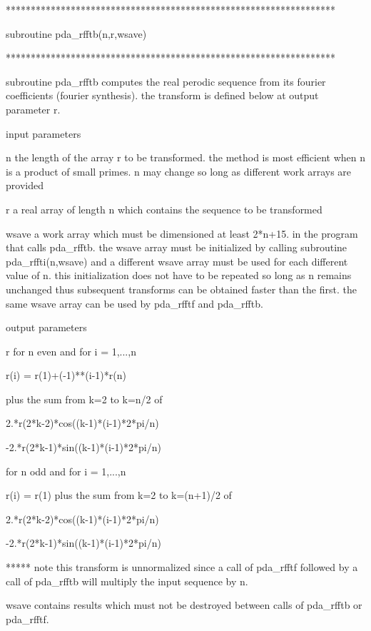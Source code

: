 \documentclass[11pt,twoside,nolof]{starlink}
\begin{document}
\begin{terminalv}
******************************************************************

subroutine pda_rfftb(n,r,wsave)

******************************************************************

subroutine pda_rfftb computes the real perodic sequence from its
fourier coefficients (fourier synthesis). the transform is defined
below at output parameter r.

input parameters

n       the length of the array r to be transformed.  the method
        is most efficient when n is a product of small primes.
        n may change so long as different work arrays are provided

r       a real array of length n which contains the sequence
        to be transformed

wsave   a work array which must be dimensioned at least 2*n+15.
        in the program that calls pda_rfftb. the wsave array must be
        initialized by calling subroutine pda_rffti(n,wsave) and a
        different wsave array must be used for each different
        value of n. this initialization does not have to be
        repeated so long as n remains unchanged thus subsequent
        transforms can be obtained faster than the first.
        the same wsave array can be used by pda_rfftf and pda_rfftb.


output parameters

r       for n even and for i = 1,...,n

             r(i) = r(1)+(-1)**(i-1)*r(n)

                  plus the sum from k=2 to k=n/2 of

                   2.*r(2*k-2)*cos((k-1)*(i-1)*2*pi/n)

                  -2.*r(2*k-1)*sin((k-1)*(i-1)*2*pi/n)

        for n odd and for i = 1,...,n

             r(i) = r(1) plus the sum from k=2 to k=(n+1)/2 of

                  2.*r(2*k-2)*cos((k-1)*(i-1)*2*pi/n)

                 -2.*r(2*k-1)*sin((k-1)*(i-1)*2*pi/n)

 *****  note
             this transform is unnormalized since a call of pda_rfftf
             followed by a call of pda_rfftb will multiply the input
             sequence by n.

wsave   contains results which must not be destroyed between
        calls of pda_rfftb or pda_rfftf.
\end{terminalv}
\end{document}
